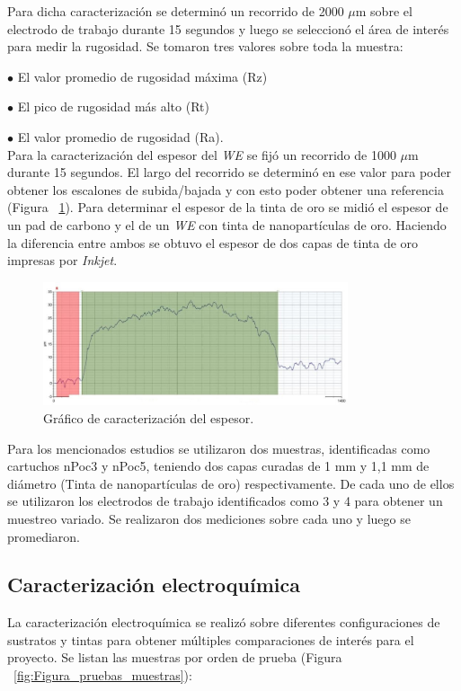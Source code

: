 Para dicha caracterización se determinó un recorrido de 2000 $\mu$m sobre el electrodo de trabajo durante 15 segundos y luego se seleccionó el área de interés para medir la rugosidad. Se tomaron tres valores sobre toda la muestra:

$\bullet$ El valor promedio de rugosidad máxima (Rz)

$\bullet$ El pico de rugosidad más alto (Rt)

$\bullet$ El valor promedio de rugosidad (Ra).
\\

Para la caracterización del espesor del \emph{WE} se fijó un recorrido de 1000 $\mu$m durante 15 segundos. El largo del recorrido se determinó en ese valor para poder obtener los escalones de subida/bajada y con esto poder obtener una referencia (Figura ~\ref{fig:Figura_grafico_perfilometro}). Para determinar el espesor de la tinta de oro se midió el espesor de un pad de carbono y el de un \emph{WE} con tinta de nanopartículas de oro. Haciendo la diferencia entre ambos se obtuvo el espesor de dos capas de tinta de oro impresas por \textit{Inkjet}.

\begin{figure}[H]
  \centering
    \includegraphics[width=0.8\textwidth]{Figuras/Figura_grafico_perfilometro}
  \caption{Gráfico de caracterización del espesor.}
  \label{fig:Figura_grafico_perfilometro}
\end{figure}

Para los mencionados estudios se utilizaron dos muestras, identificadas como cartuchos nPoc3 y nPoc5, teniendo dos capas curadas de 1 mm y 1,1 mm de diámetro (Tinta de nanopartículas de oro) respectivamente. De cada uno de ellos se utilizaron los electrodos de trabajo identificados como 3 y 4 para obtener un muestreo variado. Se realizaron dos mediciones sobre cada uno y luego se promediaron.

\subsection{Caracterización electroquímica}
La caracterización electroquímica se realizó sobre diferentes configuraciones de sustratos y tintas para obtener múltiples comparaciones de interés para el proyecto. Se listan las muestras por orden de prueba (Figura ~\ref{fig:Figura_pruebas_muestras}):

